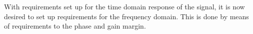 
With requirements set up for the time domain response of the signal, it is now desired to set up requirements for the frequency domain. This is done by means of requirements to the phase and gain margin. 

